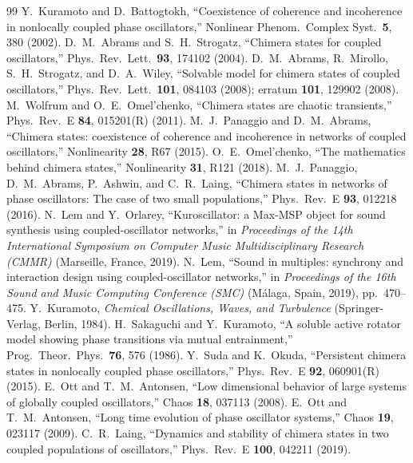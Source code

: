 \documentclass[11pt]{article}
\begin{document}
\begin{thebibliography}{99}
\small
{} Y.~Kuramoto and D.~Battogtokh, ``Coexistence of coherence and incoherence in nonlocally coupled phase oscillators,'' Nonlinear Phenom.\ Complex Syst.\ \textbf{5}, 380 (2002).
 D.~M.~Abrams and S.~H.~Strogatz, ``Chimera states for coupled oscillators,'' Phys.\ Rev.\ Lett.\ \textbf{93}, 174102 (2004).
 D.~M.~Abrams, R.~Mirollo, S.~H.~Strogatz, and D.~A.~Wiley, ``Solvable model for chimera states of coupled oscillators,'' Phys.\ Rev.\ Lett.\ \textbf{101}, 084103 (2008); erratum \textbf{101}, 129902 (2008).
 M.~Wolfrum and O.~E.~Omel'chenko, ``Chimera states are chaotic transients,'' Phys.\ Rev.\ E \textbf{84}, 015201(R) (2011).
 M.~J.~Panaggio and D.~M.~Abrams, ``Chimera states: coexistence of coherence and incoherence in networks of coupled oscillators,'' Nonlinearity \textbf{28}, R67 (2015).
 O.~E.~Omel'chenko, ``The mathematics behind chimera states,'' Nonlinearity \textbf{31}, R121 (2018).
 M.~J.~Panaggio, D.~M.~Abrams, P.~Ashwin, and C.~R.~Laing, ``Chimera states in networks of phase oscillators: The case of two small populations,'' Phys.\ Rev.\ E \textbf{93}, 012218 (2016).
 N.~Lem and Y.~Orlarey, ``Kuroscillator: a Max-MSP object for sound synthesis using coupled-oscillator networks,'' in \emph{Proceedings of the 14th International Symposium on Computer Music Multidisciplinary Research (CMMR)} (Marseille, France, 2019).
 N.~Lem, ``Sound in multiples: synchrony and interaction design using coupled-oscillator networks,'' in \emph{Proceedings of the 16th Sound and Music Computing Conference (SMC)} (M\'alaga, Spain, 2019), pp.\ 470--475.
 Y.~Kuramoto, \emph{Chemical Oscillations, Waves, and Turbulence} (Springer-Verlag, Berlin, 1984).
 H.~Sakaguchi and Y.~Kuramoto, ``A soluble active rotator model showing phase transitions via mutual entrainment,'' Prog.\ Theor.\ Phys.\ \textbf{76}, 576 (1986).
 Y.~Suda and K.~Okuda, ``Persistent chimera states in nonlocally coupled phase oscillators,'' Phys.\ Rev.\ E \textbf{92}, 060901(R) (2015).
 E.~Ott and T.~M.~Antonsen, ``Low dimensional behavior of large systems of globally coupled oscillators,'' Chaos \textbf{18}, 037113 (2008).
 E.~Ott and T.~M.~Antonsen, ``Long time evolution of phase oscillator systems,'' Chaos \textbf{19}, 023117 (2009).
 C.~R.~Laing, ``Dynamics and stability of chimera states in two coupled populations of oscillators,'' Phys.\ Rev.\ E \textbf{100}, 042211 (2019).

\end{thebibliography}
\end{document}
